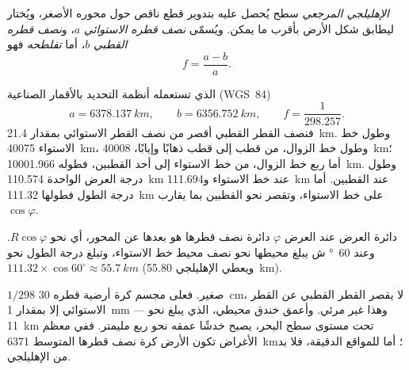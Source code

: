 \begin{definition}\label{def:g10:measuring-the-earth:ellipsoid}
\emph{الإهليلجي المرجعي} سطح يُحصل عليه بتدوير قطع ناقص
حول محوره الأصغر، ويُختار ليطابق شكل الأرض بأقرب ما يمكن. ويُسمّى
\emph{نصف قطره الاستوائي} $a$، و\emph{نصف قطره القطبي} $b$، أما
\emph{تفلطحه} فهو
\[
  f = \frac{a-b}{a}.
\]
\end{definition}

\begin{proposition}\label{prop:g10:measuring-the-earth:dimensions}
 الذي تستعمله أنظمة التحديد بالأقمار الصناعية (WGS~84)
\[
  a = \qty{6378.137}{km}, \qquad b = \qty{6356.752}{km}, \qquad
  f = \frac{1}{298.257}.
\]
فنصف القطر القطبي أقصر من نصف القطر الاستوائي بمقدار \qty{21.4}{km}. وطول خط
الاستواء \qty{40075}{km}، وطول خط الزوال، من قطب إلى قطب ذهابًا وإيابًا،
\qty{40008}{km}؛ أما ربع خط الزوال، من خط الاستواء إلى أحد القطبين، فطوله
\qty{10001.966}{km}. وطول درجة العرض الواحدة \qty{110.574}{km} عند خط
الاستواء و\qty{111.694}{km} عند القطبين. أما درجة الطول فطولها
\qty{111.32}{km} على خط الاستواء، وتقصر نحو القطبين بما يقارب
$\cos \varphi$.
\end{proposition}

\begin{example}\label{ex:g10:measuring-the-earth:longitude}
دائرة العرض عند العرض $\varphi$ دائرة نصف قطرها هو بعدها عن المحور، أي نحو
$R \cos \varphi$. وعند \qty{60}{\degree} ش يبلغ محيطها نحو نصف محيط خط الاستواء،
وتبلغ درجة الطول نحو $111.32 \times \cos 60^\circ \approx \qty{55.7}{km}$ (ويعطي
الإهليلجي \qty{55.80}{km}).
\end{example}

\begin{remark}\label{rem:g10:measuring-the-earth:round}
 $1/298$ صغير. فعلى مجسم كرة أرضية قطره \qty{30}{cm}، لا يقصر القطر
القطبي عن القطر الاستوائي إلا بمقدار \qty{1}{mm} --- وهذا غير مرئي. وأعمق خندق
محيطي، الذي يبلغ نحو \qty{11}{km} تحت مستوى سطح البحر، يصبح خدشًا عمقه نحو ربع
مليمتر. ففي معظم الأغراض تكون الأرض كرة نصف قطرها المتوسط \qty{6371}{km}؛ أما
للمواقع الدقيقة، فلا بد من الإهليلجي.
\end{remark}

